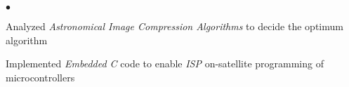 \documentclass[margin,line, 9pt]{res}
\newenvironment{list1}{
  \begin{list}{\ding{113}}{%
      \setlength{\itemsep}{0in}
      \setlength{\parsep}{0in} \setlength{\parskip}{0in}
      \setlength{\topsep}{0in} \setlength{\partopsep}{0in} 
      \setlength{\leftmargin}{0.17in}}}{\end{list}}
\newenvironment{list2}{
  \begin{list}{$\bullet$}{%
      \setlength{\itemsep}{0.03in}
      \setlength{\parsep}{0in} \setlength{\parskip}{0in}
      \setlength{\topsep}{0in} \setlength{\partopsep}{0in} 
      \setlength{\leftmargin}{0.2in}}}{\end{list}}
\begin{document}
\vspace*{-.13in}
\begin{list2}
\item Analyzed \emph{Astronomical Image Compression Algorithms} to decide the optimum algorithm
\item Implemented \emph{Embedded C} code to enable \emph{ISP} on-satellite programming of microcontrollers
\end{list2}
% 
% 
% 
% 
% 
% 
%
%
\end{document}
